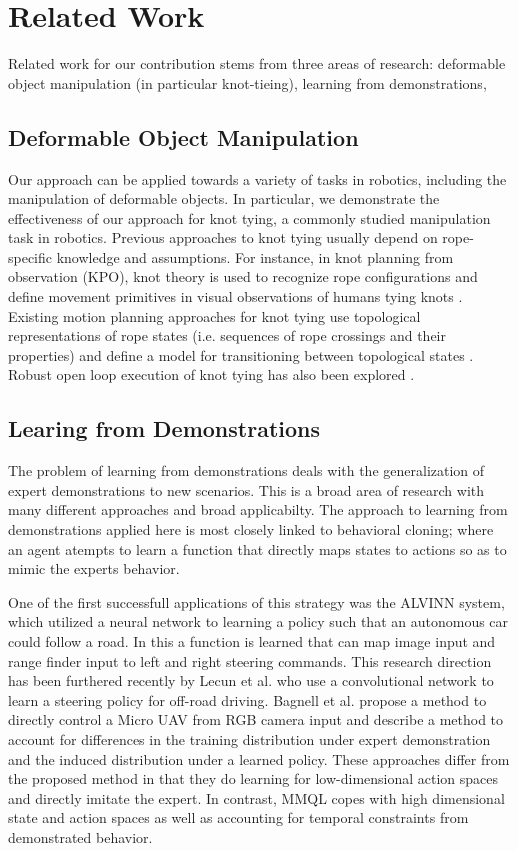\section{Related Work}
Related work for our contribution stems from three areas of research: deformable object manipulation (in particular knot-tieing), learning from demonstrations, 
\subsection{Deformable Object Manipulation}
Our approach can be applied towards a variety of tasks in robotics,
including the manipulation of deformable objects.
In particular, we demonstrate the effectiveness of our approach for
knot tying, a commonly studied manipulation task in robotics.
Previous approaches to knot tying usually depend on rope-specific knowledge
and assumptions.
For instance, in knot planning from observation (KPO), knot theory is used
to recognize rope configurations and define movement primitives in visual
observations of humans tying knots \cite{Morita_ICRA2003, Takamatsu_TransRob2006}.
Existing motion planning approaches for knot tying use topological
representations of rope states (i.e. sequences of rope crossings and their
properties) and define a model for transitioning between topological states
\cite{Saha_ExpRobotics2008, Wakamatsu_IJRR2006}.
Robust open loop execution of knot tying has also been explored \cite{Bell_PhD2010}.

\subsection{Learing from Demonstrations}
The problem of learning from demonstrations deals with the generalization of expert demonstrations to new scenarios. 
This is a broad area of research with many different approaches and broad applicabilty.
The approach to learning from demonstrations applied here is most closely linked to behavioral cloning; where an agent atempts to learn a function that directly maps states to actions so as to mimic the experts behavior. 

One of the first successfull applications of this strategy was the ALVINN system, which utilized a neural network to learning a policy such that an autonomous car could follow a road.
In this a function is learned that can map image input and range finder input to left and right steering commands. 
This research direction has been furthered recently by Lecun et al.  who use a convolutional network to learn a steering policy for off-road driving.
Bagnell et al. propose a method to directly control a Micro UAV from RGB camera input and describe a method to account for differences in the training distribution under expert demonstration and the induced distribution under a learned policy. 
These approaches differ from the proposed method in that they do learning for low-dimensional action spaces and directly imitate the expert.
In contrast, MMQL copes with high dimensional state and action spaces as well as accounting for temporal constraints from demonstrated behavior.

